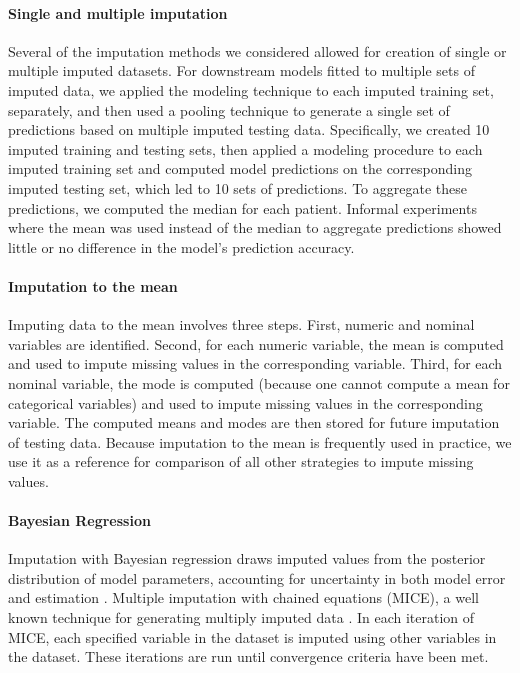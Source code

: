 \documentclass{article}
\begin{document}
\label{subsec:imputation}

\paragraph{Single and multiple imputation}

Several of the imputation methods we considered allowed for creation of
single or multiple imputed datasets. For downstream models fitted to
multiple sets of imputed data, we applied the modeling technique to each
imputed training set, separately, and then used a pooling technique to
generate a single set of predictions based on multiple imputed testing
data. Specifically, we created 10 imputed training and testing sets,
then applied a modeling procedure to each imputed training set and
computed model predictions on the corresponding imputed testing set,
which led to 10 sets of predictions. To aggregate these predictions, we
computed the median for each patient. Informal experiments where the
mean was used instead of the median to aggregate predictions showed
little or no difference in the model's prediction accuracy.

\paragraph{Imputation to the mean}

Imputing data to the mean involves three steps. First, numeric and
nominal variables are identified. Second, for each numeric variable, the
mean is computed and used to impute missing values in the corresponding
variable. Third, for each nominal variable, the mode is computed
(because one cannot compute a mean for categorical variables) and used
to impute missing values in the corresponding variable. The computed
means and modes are then stored for future imputation of testing data.
Because imputation to the mean is frequently used in practice, we use it
as a reference for comparison of all other strategies to impute missing
values.

\paragraph{Bayesian Regression}

Imputation with Bayesian regression draws imputed values from the
posterior distribution of model parameters, accounting for uncertainty
in both model error and estimation \cite{rubin2004multiple}. Multiple
imputation with chained equations (MICE), a well known technique for
generating multiply imputed data
\cite{azur2011multiple, van2018flexible, van2006fully}. In each
iteration of MICE, each specified variable in the dataset is imputed
using other variables in the dataset. These iterations are run until
convergence criteria have been met.
\end{document}
